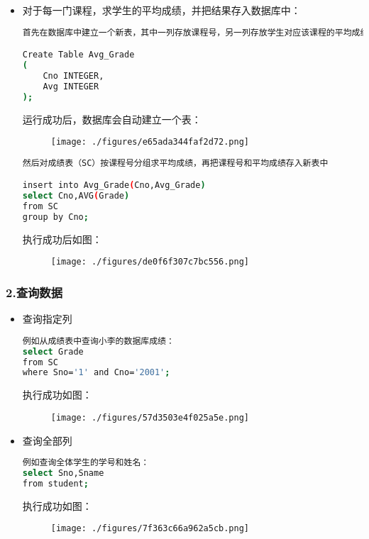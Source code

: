 \begin{itemize}
\item 对于每一门课程，求学生的平均成绩，并把结果存入数据库中：
\begin{lstlisting}[language=bash]
首先在数据库中建立一个新表，其中一列存放课程号，另一列存放学生对应该课程的平均成绩

Create Table Avg_Grade
(
    Cno INTEGER,
    Avg INTEGER
);

\end{lstlisting}
运行成功后，数据库会自动建立一个表：
\begin{figure}[ht]
\centering
\texttt{[image: ./figures/e65ada344faf2d72.png]}
\caption{} \label{fig_SQLint_18}
\end{figure}

\begin{lstlisting}[language=bash]
然后对成绩表（SC）按课程号分组求平均成绩，再把课程号和平均成绩存入新表中

insert into Avg_Grade(Cno,Avg_Grade)
select Cno,AVG(Grade)
from SC
group by Cno;
\end{lstlisting}
执行成功后如图：
\begin{figure}[ht]
\centering
\texttt{[image: ./figures/de0f6f307c7bc556.png]}
\caption{} \label{fig_SQLint_19}
\end{figure}
\end{itemize}





\subsubsection{2.查询数据}
\begin{itemize}
\item 查询指定列
\begin{lstlisting}[language=bash]
例如从成绩表中查询小李的数据库成绩：
select Grade
from SC
where Sno='1' and Cno='2001';
\end{lstlisting}执行成功如图：
\begin{figure}[ht]
\centering
\texttt{[image: ./figures/57d3503e4f025a5e.png]}
\caption{} \label{fig_SQLint_21}
\end{figure}
\end{itemize}

\begin{itemize}
\item 查询全部列
\begin{lstlisting}[language=bash]
例如查询全体学生的学号和姓名：
select Sno,Sname
from student;
\end{lstlisting}

执行成功如图：
\begin{figure}[ht]
\centering
\texttt{[image: ./figures/7f363c66a962a5cb.png]}
\caption{} \label{fig_SQLint_20}
\end{figure}
\end{itemize}

